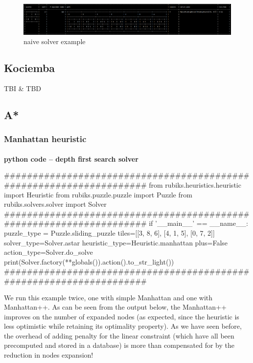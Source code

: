 \begin{figure}[H]
\centering
\includegraphics[scale=0.39]{./Figures/examplenaivesolver}
\caption[Examples]{naive solver example}
\label{fig:examplenaivesolver}
\end{figure}



\subsection{Kociemba}
TBI \& TBD


\subsection{A*}
\label{ASSS}

\subsubsection{Manhattan heuristic}



\afblue
\paragraph{}{\textbf{python code -- depth first search solver}}
\begin{python}
####################################################################
from rubiks.heuristics.heuristic import Heuristic
from rubiks.puzzle.puzzle import Puzzle
from rubiks.solvers.solver import Solver
####################################################################
if '__main__' == __name__:
    puzzle_type = Puzzle.sliding_puzzle
    tiles=[[3, 8, 6], [4, 1, 5], [0, 7, 2]]
    solver_type=Solver.astar
    heuristic_type=Heuristic.manhattan
    plus=False
    action_type=Solver.do_solve
    print(Solver.factory(**globals()).action().to_str_light())
####################################################################
\end{python}
\black
We run this example twice, one with simple Manhattan and one with Manhattan++. As can be seen from the output below, the Manhattan++ improves on the number of expanded nodes (as expected, since the heuristic is less optimistic while retaining its optimality property). As we have seen before, the overhead of adding penalty for the linear constraint (which have all been precomputed and stored in a database) is more than compensated for by the reduction in nodes expansion!

